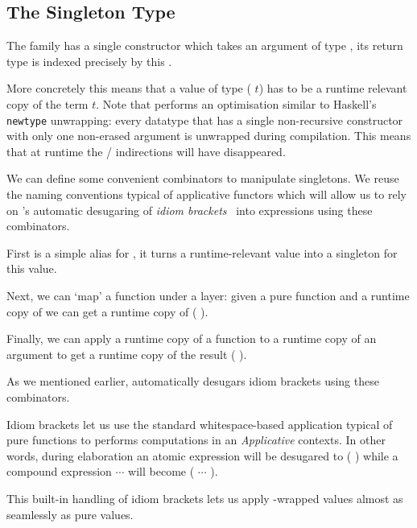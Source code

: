 \subsection{The Singleton Type}\label{sec:datasingleton}

The  family has a single constructor
which takes an argument  of type ,
its return type is indexed precisely by this .


More concretely this means that a value of type
( $t$) has to be a runtime relevant
copy of the term $t$.
%
Note that \idris{} performs an optimisation similar to Haskell's
\texttt{newtype} unwrapping: every datatype that has a single
non-recursive constructor with only one non-erased argument
is unwrapped during compilation.
%
This means that at runtime the
 /  indirections
will have disappeared.

We can define some convenient combinators to manipulate
singletons.
%
We reuse the naming conventions typical of applicative
functors which will allow us to rely on \idris{}'s automatic
desugaring of \emph{idiom brackets}~\citep{DBLP:journals/jfp/McbrideP08}
into expressions using these combinators.

First  is a simple alias for ,
it turns a runtime-relevant value  into a singleton for
this value.


Next, we can `map' a function under a  layer: given
a pure function  and a runtime copy of  we
can get a runtime copy of ( ).


Finally, we can apply a runtime copy of a function 
to a runtime copy of an argument 
to get a runtime copy of the result ( ).


As we mentioned earlier, \idris{} automatically desugars idiom brackets
using these combinators.

\begin{remark}
  Idiom brackets let us use the standard whitespace-based application
  typical of pure functions to performs computations in an \emph{Applicative}
  contexts.
%
  In other words, during elaboration an atomic expression
  \IdrisKeyword{[|}  \IdrisKeyword{|]}
  will be desugared to ( )
  while a compound expression
  \IdrisKeyword{[|}   $\cdots$  \IdrisKeyword{|]}
  will become ( \IdrisFunction{<\$>}  \IdrisFunction{<*>} $\cdots$ \IdrisFunction{<*>} ).
\end{remark}

This built-in handling of idiom brackets lets us apply
-wrapped values almost as seamlessly
as pure values.
